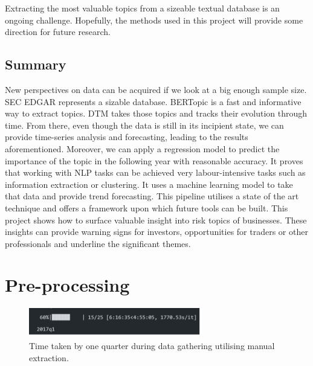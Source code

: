\documentclass[12pt,MSc,a4paper,oneside]{muthesis}
\begin{document}
    Extracting the most valuable topics from a sizeable textual database is an ongoing challenge. Hopefully, the methods used in this project will provide some direction for future research.

    \section{Summary}
    New perspectives on data can be acquired if we look at a big enough sample size. SEC EDGAR represents a sizable database. BERTopic is a fast and informative way to extract topics. DTM takes those topics and tracks their evolution through time. From there, even though the
    data is still in its incipient state, we can provide time-series analysis and forecasting, leading to the results aforementioned. Moreover, we can apply a regression model to predict the importance of the topic in the following year with reasonable accuracy. It proves that working
    with NLP tasks can be achieved very labour-intensive tasks such as information extraction or clustering. It uses a machine learning model to take that data and provide trend forecasting. This pipeline utilises a state of the art technique and offers a framework upon which future tools can be built. This project shows how to surface valuable insight into risk topics of businesses. These insights can provide warning signs for investors, opportunities for traders or other professionals and underline the significant themes.

    \providecommand{\harvardpreambledefs}[1]{#1}
    \providecommand{\harvardpreambletext}[1]{}
    \cleardoublepage
    

    \appendix
    \chapter{Pre-processing}
    \label{appendix:1}
    \begin{figure}[h]
      \centering
      \includegraphics[scale=3]{images/appendix/Time taken by one quarter.png}
      \caption{Time taken by one quarter during data gathering utilising manual extraction.}
    \end{figure}
\end{document}
